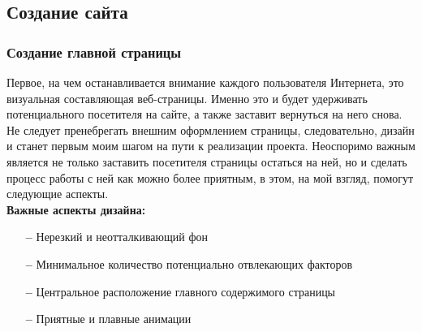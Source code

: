 \documentclass[a4paper, 12pt]{extarticle}
\begin{document}
\subsection{Создание сайта}
\subsubsection{Создание главной страницы}
Первое, на чем останавливается внимание каждого пользователя Интернета, это
визуальная составляющая веб-страницы. Именно это и будет удерживать
потенциального посетителя на сайте, а также заставит вернуться на него снова.
Не следует пренебрегать внешним оформлением страницы, следовательно, дизайн и
станет первым моим шагом на пути к реализации проекта. Неоспоримо важным
является не только заставить посетителя страницы остаться на ней, но и сделать
процесс работы с ней как можно более приятным, в этом, на мой взгляд, помогут
следующие аспекты.
\\

\textbf{Важные аспекты дизайна:}
\begin{itemize}
    \item[\bfseries--] Нерезкий и неотталкивающий фон
    \item[\bfseries--] Минимальное количество потенциально отвлекающих
        факторов
    \item[\bfseries--] Центральное расположение главного содержимого страницы
    \item[\bfseries--] Приятные и плавные анимации
\end{itemize}
\end{document}
